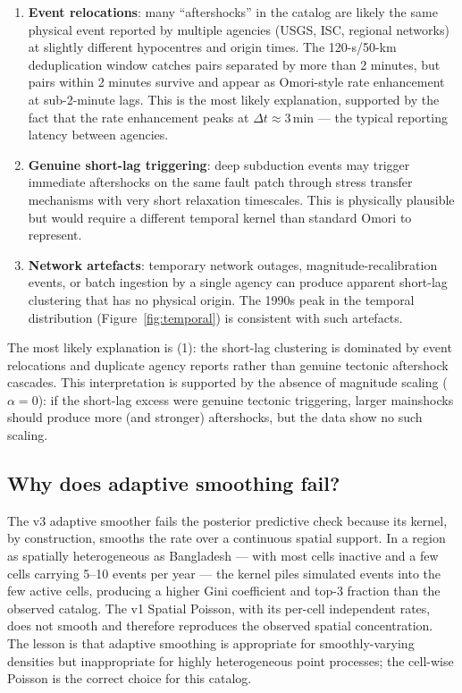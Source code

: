 \documentclass[10pt,a4paper,twocolumn]{article}
\begin{document}
\begin{enumerate}[leftmargin=1.2em,itemsep=2pt,topsep=2pt]
\item \textbf{Event relocations}: many ``aftershocks'' in the catalog are likely the same physical event reported by multiple agencies (USGS, ISC, regional networks) at slightly different hypocentres and origin times. The 120-s/50-km deduplication window catches pairs separated by more than 2 minutes, but pairs within 2 minutes survive and appear as Omori-style rate enhancement at sub-2-minute lags. This is the most likely explanation, supported by the fact that the rate enhancement peaks at $\Delta t\approx3$\,min --- the typical reporting latency between agencies.
\item \textbf{Genuine short-lag triggering}: deep subduction events may trigger immediate aftershocks on the same fault patch through stress transfer mechanisms with very short relaxation timescales. This is physically plausible but would require a different temporal kernel than standard Omori to represent.
\item \textbf{Network artefacts}: temporary network outages, magnitude-recalibration events, or batch ingestion by a single agency can produce apparent short-lag clustering that has no physical origin. The 1990s peak in the temporal distribution (Figure~\ref{fig:temporal}) is consistent with such artefacts.
\end{enumerate}

The most likely explanation is (1): the short-lag clustering is dominated by event relocations and duplicate agency reports rather than genuine tectonic aftershock cascades. This interpretation is supported by the absence of magnitude scaling ($\alpha=0$): if the short-lag excess were genuine tectonic triggering, larger mainshocks should produce more (and stronger) aftershocks, but the data show no such scaling.

\subsection{Why does adaptive smoothing fail?}

The v3 adaptive smoother fails the posterior predictive check because its kernel, by construction, smooths the rate over a continuous spatial support. In a region as spatially heterogeneous as Bangladesh --- with most cells inactive and a few cells carrying 5--10 events per year --- the kernel piles simulated events into the few active cells, producing a higher Gini coefficient and top-3 fraction than the observed catalog. The v1 Spatial Poisson, with its per-cell independent rates, does not smooth and therefore reproduces the observed spatial concentration. The lesson is that adaptive smoothing is appropriate for smoothly-varying densities but inappropriate for highly heterogeneous point processes; the cell-wise Poisson is the correct choice for this catalog.
\end{document}
